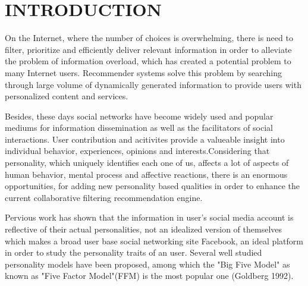 \newpage
{}
\section{INTRODUCTION}
On the Internet, where the number of choices is overwhelming, there is need to filter, prioritize and efficiently deliver relevant information in order to alleviate the problem of information overload, which has created a potential problem to many Internet users. Recommender systems solve this problem by searching through large volume of dynamically generated information to provide users with personalized content and services. 

Besides, these days social networks have become widely used and popular mediums for information dissemination as well as the facilitators of social interactions. User contribution and acitivites provide a valueable insight into individual behavior, experiences, opinions and interests.Considering that personality, which uniquely identifies each one of us, affects a lot of aspects of human behavior, mental process and affective reactions, there is an enormous opportunities, for adding new personality based qualities in order to enhance the current collaborative filtering recommendation engine.

Pervious work has shown that the information in user's social media account is reflective of their actual personalities, not an idealized version of themselves which makes a broad user base social networking site Facebook, an ideal platform in order to study the personality traits of an user. Several well studied personality models have been proposed, among which the "Big Five Model" as known as "Five Factor Model"(FFM) is the most popular one (Goldberg 1992)\cite{fivefactormodel}.

